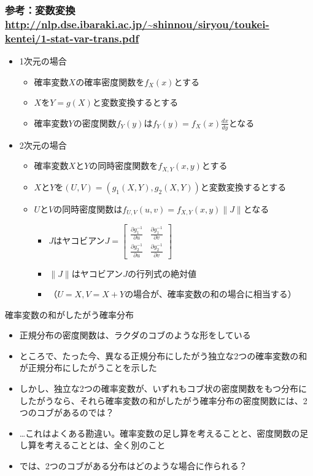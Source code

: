 \documentclass[aspectratio=169,unicode,dvipdfmx,14pt]{beamer}
\begin{document}
\begin{frame}
\frametitle{参考：変数変換 \\ \vspace{-.3in} {\footnotesize \href{http://nlp.dse.ibaraki.ac.jp/\~shinnou/siryou/toukei-kentei/1-stat-var-trans.pdf}{\url{http://nlp.dse.ibaraki.ac.jp/~shinnou/siryou/toukei-kentei/1-stat-var-trans.pdf}}}}
\begin{itemize}
\item 1次元の場合
\begin{itemize}
\item 確率変数$X$の確率密度関数を$f_X(x)$とする
\item $X$を$Y=g(X)$と変数変換するとする
\item 確率変数$Y$の密度関数$f_Y(y)$は$f_Y(y) = f_X(x) \frac{dx}{dy}$となる
\end{itemize}
\item 2次元の場合
\begin{itemize}
\item 確率変数$X$と$Y$の同時密度関数を$f_{X,Y}(x,y)$とする
\item $X$と$Y$を$(U,V)=(g_1(X,Y), g_2(X,Y))$と変数変換するとする
\item $U$と$V$の同時密度関数は$f_{U,V}(u,v)=f_{X,Y}(x,y)\| J \|$となる
\begin{itemize}
\item $J$はヤコビアン$J=\begin{bmatrix} \frac{\partial g_1^{-1}}{\partial u} & \frac{\partial g_1^{-1}}{\partial v} 
\\ \frac{\partial g_2^{-1}}{\partial u} & \frac{\partial g_2^{-1}}{\partial v} \end{bmatrix}$
\item $\| J \|$はヤコビアン$J$の行列式の絶対値
\item[] （$U=X, V=X+Y$の場合が、確率変数の和の場合に相当する）
\end{itemize}
\end{itemize}

\end{itemize}
\end{frame}


\begin{frame}{確率変数の和がしたがう確率分布}
\begin{itemize}
\item 正規分布の密度関数は、ラクダのコブのような形をしている
\item ところで、たった今、異なる正規分布にしたがう独立な2つの確率変数の和が正規分布にしたがうことを示した
\item しかし、独立な2つの確率変数が、いずれもコブ状の密度関数をもつ分布にしたがうなら、それら確率変数の和がしたがう確率分布の密度関数には、2つのコブがあるのでは？
\item …これはよくある勘違い。確率変数の足し算を考えることと、密度関数の足し算を考えることとは、全く別のこと
\item では、2つのコブがある分布はどのような場合に作られる？
\end{itemize}
\end{frame}
\end{document}
